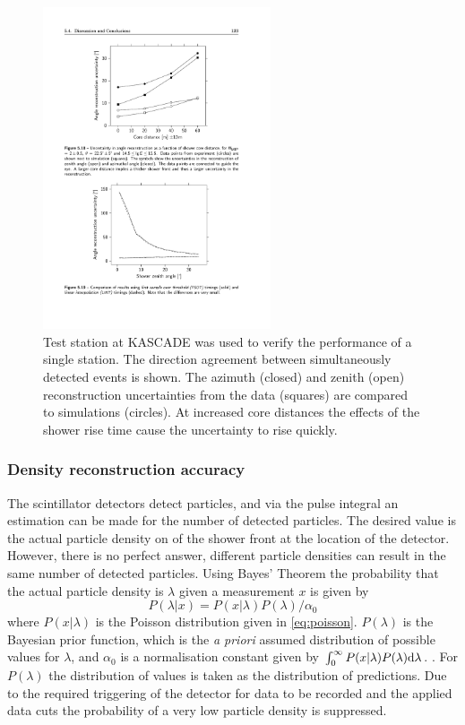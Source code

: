 \begin{figure}
    \centering
    \includegraphics[width=0.6\textwidth]
                    {plots/station/angle_kascade_core_distance}
    \caption{Test station at KASCADE was used to verify the performance of a single station. The direction agreement between simultaneously detected events is shown. The azimuth (closed) and zenith (open) reconstruction uncertainties from the data (squares) are compared to simulations (circles). At increased core distances the effects of the shower rise time cause the uncertainty to rise quickly.}
    \label{fig:angle_kascade_core_distance}
\end{figure}


\subsubsection{Density reconstruction accuracy}
\label{sec:kascade_density}

The \hisparc scintillator detectors detect particles, and via the pulse integral an estimation can be made for the number of detected particles. The desired value is the actual particle density on of the shower front at the location of the detector. However, there is no perfect answer, different particle densities can result in the same number of detected particles. Using Bayes' Theorem the probability that the actual particle density is $\lambda$ given a measurement $x$ is given by
%
\begin{equation}
    \label{eq:bayes_poisson}
    P(\lambda|x) = P(x|\lambda) P(\lambda) / \alpha_0
\end{equation}
%
where $P(x|\lambda)$ is the Poisson distribution given in \ref{eq:poisson}. $P(\lambda)$ is the Bayesian prior function, which is the \emph{a priori} assumed distribution of possible values for $\lambda$, and $\alpha_0$ is a normalisation constant given by $\int_0^\infty P(x|\lambda) P(\lambda) \mathrm{d} \lambda$. \cite{vulpen2011poisson}. For $P(\lambda)$ the distribution of values is taken as the distribution of \kascade predictions. Due to the required triggering of the \kascade detector for data to be recorded and the applied data cuts the probability of a very low particle density is suppressed.

